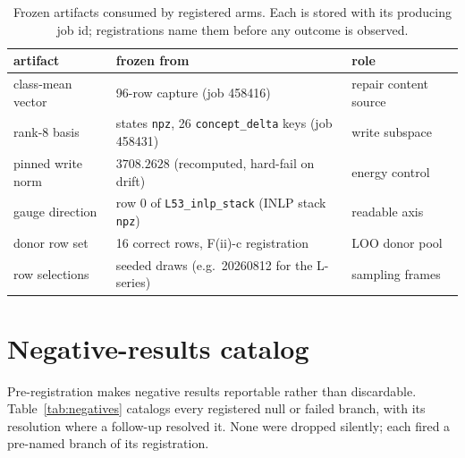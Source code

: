 \documentclass{article} %
\begin{document}
\begin{table}[h]
\centering\small
\begin{tabular}{@{}lll@{}}
\toprule
artifact & frozen from & role \\
\midrule
class-mean vector & 96-row capture (job 458416) & repair content source \\
rank-8 basis & states \texttt{npz}, 26 \texttt{concept\_delta} keys (job 458431) & write subspace \\
pinned write norm & $3708.2628$ (recomputed, hard-fail on drift) & energy control \\
gauge direction & row 0 of \texttt{L53\_inlp\_stack} (INLP stack \texttt{npz}) & readable axis \\
donor row set & 16 correct rows, F(ii)-c registration & LOO donor pool \\
row selections & seeded draws (e.g.\ 20260812 for the L-series) & sampling frames \\
\bottomrule
\end{tabular}
\caption{Frozen artifacts consumed by registered arms. Each is stored with
its producing job id; registrations name them before any outcome is
observed.}
\label{tab:artifacts}
\end{table}

\section{Negative-results catalog}\label{app:negatives}

Pre-registration makes negative results reportable rather than
discardable. Table~\ref{tab:negatives} catalogs every registered null or
failed branch, with its resolution where a follow-up resolved it. None
were dropped silently; each fired a pre-named branch of its registration.
\end{document}

